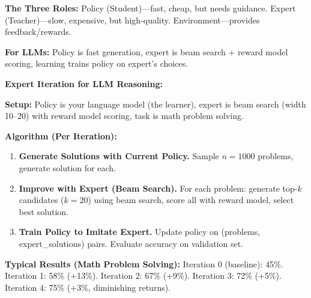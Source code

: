 \begin{chapterenv}
\begin{infobox}
\textbf{The Three Roles:} Policy (Student)---fast, cheap, but needs guidance. Expert (Teacher)---slow, expensive, but high-quality. Environment---provides feedback/rewards.

\textbf{For LLMs:} Policy is fast generation, expert is beam search + reward model scoring, learning trains policy on expert's choices.
\end{infobox}

\begin{infobox}
\textbf{Expert Iteration for LLM Reasoning:}

\textbf{Setup:} Policy is your language model (the learner), expert is beam search (width 10--20) with reward model scoring, task is math problem solving.

\textbf{Algorithm (Per Iteration):}

\begin{enumerate}[nosep]
    \item \textbf{Generate Solutions with Current Policy.} Sample $n = 1000$ problems, generate solution for each.
    \item \textbf{Improve with Expert (Beam Search).} For each problem: generate top-$k$ candidates ($k = 20$) using beam search, score all with reward model, select best solution.
    \item \textbf{Train Policy to Imitate Expert.} Update policy on (problems, expert\_solutions) pairs. Evaluate accuracy on validation set.
\end{enumerate}

\textbf{Typical Results (Math Problem Solving):} Iteration 0 (baseline): 45\%. Iteration 1: 58\% (+13\%). Iteration 2: 67\% (+9\%). Iteration 3: 72\% (+5\%). Iteration 4: 75\% (+3\%, diminishing returns).
\end{infobox}

\end{chapterenv}
